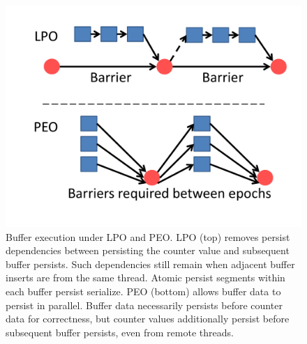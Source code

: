 \begin{figure}
\centering
\includegraphics[width=\textwidth]{PMC_patterns/buffer_PEO_LPO.pdf}
\caption{Buffer execution under LPO and PEO.  LPO (top) removes persist dependencies between persisting the counter value and subsequent buffer persists.  Such dependencies still remain when adjacent buffer inserts are from the same thread.  Atomic persist segments within each buffer persist serialize.  PEO (bottom) allows buffer data to persist in parallel.  Buffer data necessarily persists before counter data for correctness, but counter values additionally persist before subsequent buffer persists, even from remote threads.}
\label{fig:buffer_PEO_LPO}
\end{figure}
